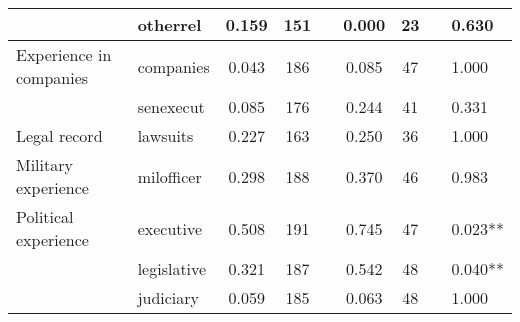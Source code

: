 \begin{table}[h!]
{\begin{threeparttable}
\begin{tabular}{llcclccll}
                                              & otherrel                                      & 0.159                 & 151                         &                      & 0.000        & 23                 &                      & 0.630                                             \\
\hline Experience in companies                       & companies                                     & 0.043                 & 186                         &                      & 0.085        & 47                 &                      & 1.000                                             \\
                                              & senexecut                                     & 0.085                 & 176                         &                      & 0.244        & 41                 &                      & 0.331                                             \\
                                              \hline Legal record& lawsuits                                      & 0.227                 & 163                         &                      & 0.250        & 36                 &                      & 1.000                                             \\
\hline Military experience                                 & milofficer                                    & 0.298                 & 188                         &                      & 0.370        & 46                 &                      & 0.983                                             \\
\hline Political experience                          & executive                                     & 0.508                 & 191                         &                      & 0.745        & 47                 &                      & 0.023**                                           \\
                                              & legislative                                   & 0.321                 & 187                         &                      & 0.542        & 48                 &                      & 0.040**                                           \\
                                              & judiciary                                     & 0.059                 & 185                         &                      & 0.063        & 48                 &                      & 1.000                                             \\

\end{tabular}
\end{threeparttable}}
\end{table}

